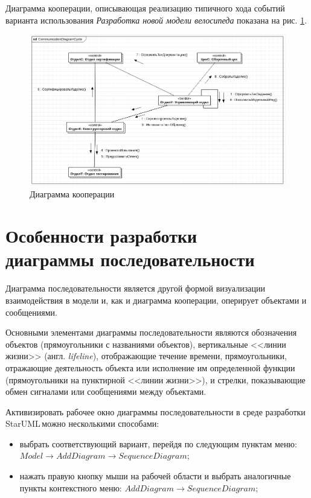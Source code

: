 \documentclass[a4paper,12pt]{report}
\newcommand{\staruml}{StarUML\,\tm}
\begin{document}
Диаграмма кооперации, описывающая реализацию типичного хода событий варианта использования \textit{Разработка новой модели велосипеда} показана на рис. \ref{fig:communication}.

\begin{figure}[h!]
	\centering
	\includegraphics[width=1\linewidth]{images/communication}
	\caption{Диаграмма кооперации}
	\label{fig:communication}
\end{figure}

\section{Особенности разработки\\диаграммы последовательности}
Диаграмма последовательности является другой формой визуализации взаимодействия в модели и, как и диаграмма кооперации, оперирует объектами и сообщениями.

Основными элементами диаграммы последовательности являются обозначения объектов (прямоугольники с названиями объектов), вертикальные
<<линии жизни>> (англ. \textit{lifeline}), отображающие течение времени, прямоугольники, отражающие деятельность объекта или исполнение им определенной функции (прямоугольники на пунктирной <<линии жизни>>), и стрелки, показывающие обмен сигналами или сообщениями между объектами.

Активизировать рабочее окно диаграммы последовательности в среде разработки \staruml можно несколькими способами:
\begin{itemize}
	\item выбрать соответствующий вариант, перейдя по следующим пунктам меню: \\$Model \to Add Diagram \to Sequence Diagram$;
	\item нажать правую кнопку мыши на рабочей области и выбрать аналогичные пункты контекстного меню: $Add Diagram \to Sequence Diagram$;
\end{itemize}
\end{document}

